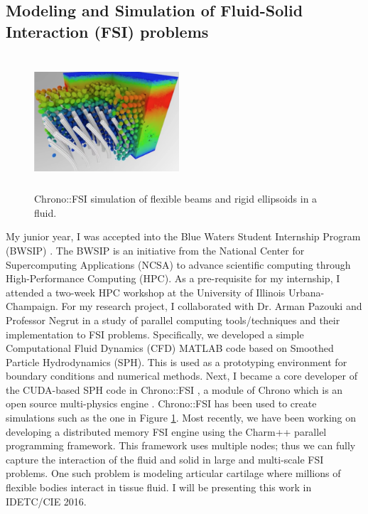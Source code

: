 \documentclass{article}
\theoremstyle{definition}
\begin{document}
\subsection*{Modeling and Simulation of Fluid-Solid Interaction (FSI) problems}


\begin{figure}
    \vspace{-23pt}

  \begin{center}
    \includegraphics[width=0.48\textwidth, height=5cm]{fsi.png}
  \end{center}
    \vspace{-15pt}

  \caption{Chrono::FSI simulation of flexible beams and rigid ellipsoids in a fluid.}\label{Fig:fsi}
  \vspace{-10pt}
\end{figure}


My junior year, I was accepted into the Blue Waters Student Internship Program (BWSIP) \cite{bwsip}. The BWSIP is an initiative from the National Center for Supercomputing Applications (NCSA) to advance scientific computing through High-Performance Computing (HPC). As a pre-requisite for my internship, I attended a two-week HPC workshop at the University of Illinois Urbana-Champaign. For my research project, I collaborated with Dr. Arman Pazouki and Professor Negrut in a study of parallel computing tools/techniques and their implementation to FSI problems. Specifically, we developed a simple Computational Fluid Dynamics (CFD) MATLAB code based on Smoothed Particle Hydrodynamics (SPH). This is used as a prototyping environment for boundary conditions and numerical methods. Next, I became a core developer of the CUDA-based SPH code in Chrono::FSI \cite{chronoFSI}, a module of Chrono which is an open source multi-physics engine \cite{chrono}. Chrono::FSI has been used to create simulations such as the one in Figure \ref{Fig:fsi}. Most recently, we have been working on developing a distributed memory FSI engine using the Charm++ parallel programming framework. This framework uses multiple nodes; thus we can fully capture the interaction of the fluid and solid in large and multi-scale FSI problems. One such problem is modeling articular cartilage where millions of flexible bodies interact in tissue fluid. I will be presenting this work in IDETC/CIE 2016.
\end{document}
